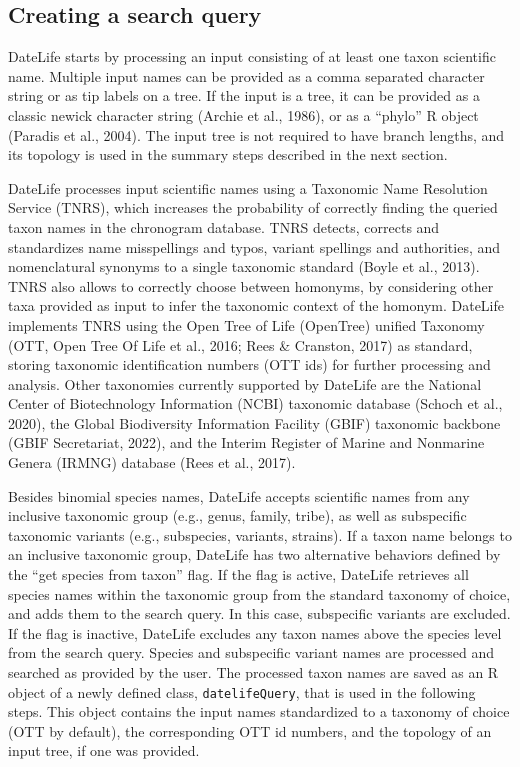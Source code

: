 \documentclass[english,man]{apa6}
\begin{document}
\hypertarget{creating-a-search-query}{%
\subsection{Creating a search query}\label{creating-a-search-query}}

DateLife starts by processing an input consisting of at least one taxon scientific name. Multiple input names can be provided as a comma separated character string or as tip labels on a tree.
If the input is a tree, it can be provided as a classic newick character string (Archie et al., 1986), or as a \enquote{phylo} R object (Paradis et al., 2004).
The input tree is not required to have branch lengths, and its topology is used in the summary steps described in the next section.

DateLife processes input scientific names using a Taxonomic Name Resolution Service (TNRS), which increases the probability of correctly finding the queried taxon names in the chronogram database. TNRS detects, corrects and standardizes name misspellings and typos, variant spellings and authorities, and nomenclatural synonyms to a single taxonomic standard (Boyle et al., 2013). TNRS also allows to correctly choose between homonyms, by considering other taxa provided as input to infer the taxonomic context of the homonym. DateLife implements TNRS using the Open Tree of Life (OpenTree) unified Taxonomy (OTT, Open Tree Of Life et al., 2016; Rees \& Cranston, 2017) as standard, storing taxonomic identification numbers (OTT ids) for further processing and analysis. Other taxonomies currently supported by DateLife are the National Center of Biotechnology Information (NCBI) taxonomic database (Schoch et al., 2020), the Global Biodiversity Information Facility (GBIF) taxonomic backbone (GBIF Secretariat, 2022), and the Interim Register of Marine and Nonmarine Genera (IRMNG) database (Rees et al., 2017).

Besides binomial species names, DateLife accepts scientific names from any inclusive taxonomic group (e.g., genus, family, tribe), as well as subspecific taxonomic variants (e.g., subspecies, variants, strains). If a taxon name belongs to an inclusive taxonomic group, DateLife has two alternative behaviors defined by the \enquote{get species from taxon} flag. If the flag is active, DateLife retrieves all species names within the taxonomic group from the standard taxonomy of choice, and adds them to the search query. In this case, subspecific variants are excluded.
If the flag is inactive, DateLife excludes any taxon names above the species level from the search query.
Species and subspecific variant names are processed and searched as provided by the user.
The processed taxon names are saved as an R object of a newly defined class, \texttt{datelifeQuery}, that is used in the following steps. This object contains the input names standardized to a taxonomy of choice (OTT by default), the corresponding OTT id numbers, and the topology of an input tree, if one was provided.
\end{document}
